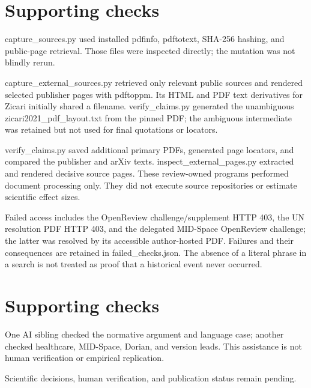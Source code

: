 \documentclass[10pt]{article}
\begin{document}
\section*{Supporting checks}
capture\_sources.py used installed pdfinfo, pdftotext, SHA-256 hashing, and public-page retrieval. Those files were inspected directly; the mutation was not blindly rerun.\par
capture\_external\_sources.py retrieved only relevant public sources and rendered selected publisher pages with pdftoppm. Its HTML and PDF text derivatives for Zicari initially shared a filename. verify\_claims.py generated the unambiguous zicari2021\_pdf\_layout.txt from the pinned PDF; the ambiguous intermediate was retained but not used for final quotations or locators.\par
verify\_claims.py saved additional primary PDFs, generated page locators, and compared the publisher and arXiv texts. inspect\_external\_pages.py extracted and rendered decisive source pages. These review-owned programs performed document processing only. They did not execute source repositories or estimate scientific effect sizes.\par
Failed access includes the OpenReview challenge/supplement HTTP 403, the UN resolution PDF HTTP 403, and the delegated MID-Space OpenReview challenge; the latter was resolved by its accessible author-hosted PDF. Failures and their consequences are retained in failed\_checks.json. The absence of a literal phrase in a search is not treated as proof that a historical event never occurred.\par
\section*{Supporting checks}
One AI sibling checked the normative argument and language case; another checked healthcare, MID-Space, Dorian, and version leads. This assistance is not human verification or empirical replication.\par
Scientific decisions, human verification, and publication status remain pending.\par
\end{document}
